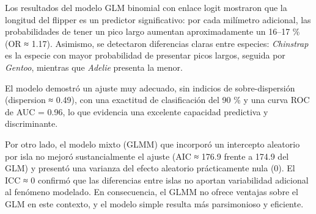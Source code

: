 \documentclass[
  spanish,
  11pt,
  a4paper,
  DIV=11,
  numbers=noendperiod]{scrartcl}
\begin{document}
Los resultados del modelo GLM binomial con enlace logit mostraron que la
longitud del flipper es un predictor significativo: por cada milímetro
adicional, las probabilidades de tener un pico largo aumentan
aproximadamente un 16--17 \% (OR ≈ 1.17). Asimismo, se detectaron
diferencias claras entre especies: \emph{Chinstrap} es la especie con
mayor probabilidad de presentar picos largos, seguida por \emph{Gentoo},
mientras que \emph{Adelie} presenta la menor.

\hfill\break
El modelo demostró un ajuste muy adecuado, sin indicios de
sobre-dispersión (dispersion ≈ 0.49), con una exactitud de clasificación
del 90 \% y una curva ROC de AUC = 0.96, lo que evidencia una excelente
capacidad predictiva y discriminante.

Por otro lado, el modelo mixto (GLMM) que incorporó un intercepto
aleatorio por isla no mejoró sustancialmente el ajuste (AIC ≈ 176.9
frente a 174.9 del GLM) y presentó una varianza del efecto aleatorio
prácticamente nula (0). El ICC ≈ 0 confirmó que las diferencias entre
islas no aportan variabilidad adicional al fenómeno modelado. En
consecuencia, el GLMM no ofrece ventajas sobre el GLM en este contexto,
y el modelo simple resulta más parsimonioso y eficiente.
\end{document}
